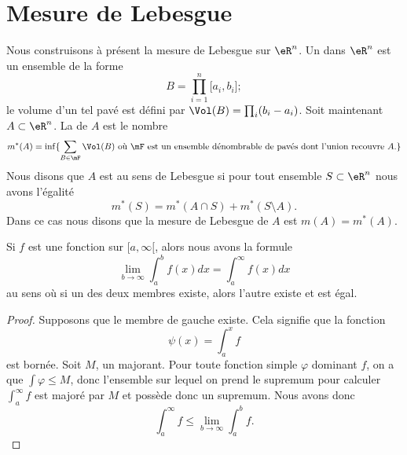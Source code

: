 
\section{Mesure de Lebesgue}

Nous construisons à présent la mesure de Lebesgue sur \( \eR^n\). Un  dans \( \eR^n\) est un ensemble de la forme 
\begin{equation}
    B=\prod_{i=1}^n\mathopen[ a_i , b_i \mathclose];
\end{equation}
le volume d'un tel pavé est défini par \( \Vol(B)=\prod_i(b_i-a_i)\). Soit maintenant \( A\subset \eR^n\). La  de \( A\) est le nombre
\begin{equation}
    m^*(A)=\inf\{ \sum_{B\in\mF}\Vol(B)\text{ où \( \mF\) est un ensemble dénombrable de pavés dont l'union recouvre \( A\).} \}
\end{equation}
Nous disons que \( A\) est  au sens de Lebesgue si pour tout ensemble \( S\subset \eR^n\) nous avons l'égalité
\begin{equation}
    m^*(S)=m^*(A\cap S)+m^*(S\setminus A).
\end{equation}
Dans ce cas nous disons que la mesure de Lebesgue de \( A\) est \( m(A)=m^*(A)\).

\begin{lemma}\label{LemTHBSEs}
    Si \( f\) est une fonction sur \( \mathopen[ a , \infty [\), alors nous avons la formule
    \begin{equation}
        \lim_{b\to \infty}\int_a^bf(x)dx=\int_a^{\infty}f(x)dx
    \end{equation}
    au sens où si un des deux membres existe, alors l'autre existe et est égal.
\end{lemma}

\begin{proof}
    Supposons que le membre de gauche existe. Cela signifie que la fonction
    \begin{equation}
        \psi(x)=\int_a^xf
    \end{equation}
    est bornée. Soit \( M\), un majorant. Pour toute fonction simple \( \varphi\) dominant \( f\), on a que \( \int\varphi\leq M\), donc l'ensemble sur lequel on prend le supremum pour calculer \( \int_a^{\infty}f\) est majoré par \( M\) et possède donc un supremum. Nous avons donc
    \begin{equation}
        \int_a^{\infty}f\leq\lim_{b\to\infty}\int_a^bf.
    \end{equation}
\end{proof}


